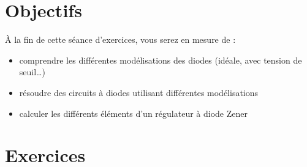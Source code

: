 \documentclass{../template/tp}
\author{The Fantastic Four}
\begin{document}

\section*{Objectifs}
À la fin de cette séance d'exercices, vous serez en mesure de :
\begin{itemize}
\item comprendre les différentes modélisations des diodes (idéale, avec tension de seuil\dots)
\item résoudre des circuits à diodes utilisant différentes modélisations
\item calculer les différents éléments d'un régulateur à diode Zener
\end{itemize}

\section*{Exercices}
\end{document}
